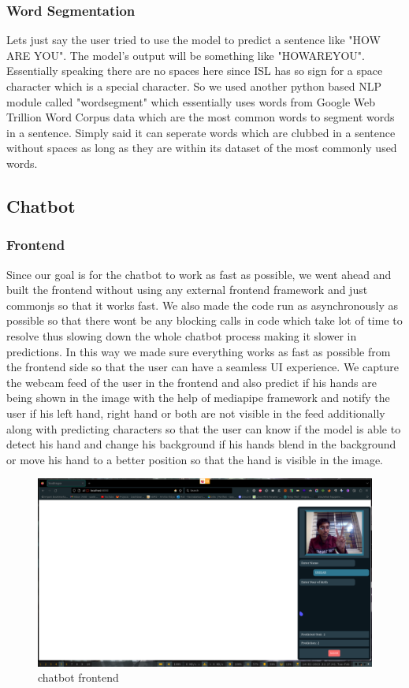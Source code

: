 \documentclass[12pt,a4paper]{report}
\begin{document}
\subsubsection{Word Segmentation}
Lets just say the user tried to use the model to predict a sentence like "HOW ARE YOU". The model's output will be something like "HOWAREYOU". Essentially speaking there are no spaces here since ISL has so sign for a space character which is a special character. So we used another python based NLP module called "wordsegment" which essentially uses words from Google Web Trillion Word Corpus data which are the most common words to segment words in a sentence. Simply said it can seperate words which are clubbed in a sentence without spaces as long as they are within its dataset of the most commonly used words.

\subsection{Chatbot}

\subsubsection{Frontend}
Since our goal is for the chatbot to work as fast as possible, we went ahead and built the frontend without using any external frontend framework and just commonjs so that it works fast. We also made the code run as asynchronously as possible so that there wont be any blocking calls in code which take lot of time to resolve thus slowing down the whole chatbot process making it slower in predictions. In this way we made sure everything works as fast as possible from the frontend side so that the user can have a seamless UI experience. We capture the webcam feed of the user in the frontend and also predict if his hands are being shown in the image with the help of mediapipe framework and notify the user if his left hand, right hand or both are not visible in the feed additionally along with predicting characters so that the user can know if the model is able to detect his hand and change his background if his hands blend in the background or move his hand to a better position so that the hand is visible in the image.
\begin{figure}[htbp]
	\centerline{\includegraphics[scale=0.2]{ui.png}}
	\caption{chatbot frontend}
	\label{ui}
\end{figure}
\end{document}
